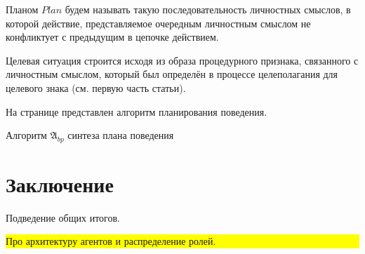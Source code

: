 \documentclass[a4paper, 12pt]{article}
\renewcommand{\baselinestretch}{2}
\theoremstyle{plain}
\begin{document}
	Планом $Plan$ будем называть такую последовательность личностных смыслов, в которой действие, представляемое очередным личностным смыслом не конфликтует с предыдущим в цепочке действием.
	
	Целевая ситуация строится исходя из образа процедурного признака, связанного с личностным смыслом, который был определён в процессе целеполагания для целевого знака (см. первую часть статьи).

\renewcommand{\baselinestretch}{1}	
	На странице \pageref{alg:beh_plan} представлен алгоритм планирования поведения.
	\begin{algorithm}
		\caption{Алгоритм $\mathfrak{A}_{bp}$ синтеза плана поведения}\label{alg:beh_plan}
		\begin{algorithmic}[1]
			
		\end{algorithmic}
	\end{algorithm}
\renewcommand{\baselinestretch}{2}	

	\section*{Заключение} Подведение общих итогов.
	
	\noindent\colorbox{yellow}{
		\parbox{\dimexpr\linewidth-2\fboxsep}{Про архитектуру агентов и распределение ролей.}
	}
	
	
	
\end{document}
